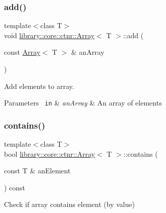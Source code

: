 \subsubsection{\texorpdfstring{add()}{add()}\hspace{0.1cm}{\footnotesize\ttfamily [2/2]}}
{\footnotesize\ttfamily template$<$class T$>$ \\
void \mbox{\hyperlink{classlibrary_1_1core_1_1ctnr_1_1_array}{library\+::core\+::ctnr\+::\+Array}}$<$ T $>$\+::add (\begin{DoxyParamCaption}\item[{const \mbox{\hyperlink{classlibrary_1_1core_1_1ctnr_1_1_array}{Array}}$<$ T $>$ \&}]{an\+Array }\end{DoxyParamCaption})}



Add elements to array. 


\begin{DoxyCode}{0}
\end{DoxyCode}



\begin{DoxyParams}[1]{Parameters}
\mbox{\texttt{ in}}  & {\em an\+Array} & An array of elements \\
\hline
\end{DoxyParams}
\mbox{\label{classlibrary_1_1core_1_1ctnr_1_1_array_a9c423eb8a34dddc81e0ede9435094e99}} 
\subsubsection{\texorpdfstring{contains()}{contains()}}
{\footnotesize\ttfamily template$<$class T$>$ \\
bool \mbox{\hyperlink{classlibrary_1_1core_1_1ctnr_1_1_array}{library\+::core\+::ctnr\+::\+Array}}$<$ T $>$\+::contains (\begin{DoxyParamCaption}\item[{const T \&}]{an\+Element }\end{DoxyParamCaption}) const}



Check if array contains element (by value) 


